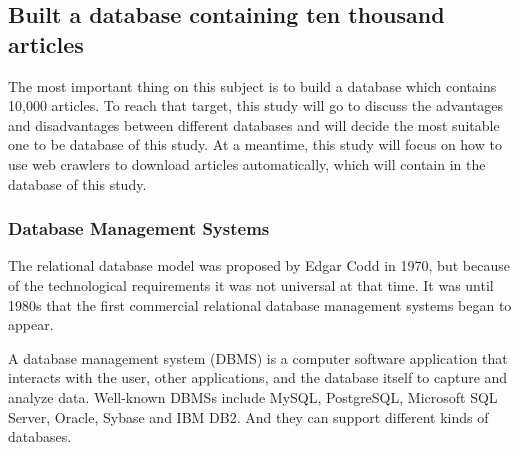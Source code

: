 	
\subsection{Built a database containing ten thousand articles}

The most important thing on this subject is to build a database which contains 10,000 articles. To reach that target, this study will go to discuss the advantages and disadvantages between different databases and will decide the most suitable one to be database of this study. At a meantime, this study will focus on how to use web crawlers to download articles automatically, which will contain in the database of this study.  



\subsubsection*{Database Management Systems}

The relational database model was proposed by Edgar Codd in 1970, but because of the technological requirements it was not universal at that time. It was until 1980s that the first commercial relational database management systems began to appear.

A database management system (DBMS) is a computer software application that interacts with the user, other applications, and the database itself to capture and analyze data. Well-known DBMSs include MySQL, PostgreSQL, Microsoft SQL Server, Oracle, Sybase and IBM DB2. And they can support different kinds of databases.

